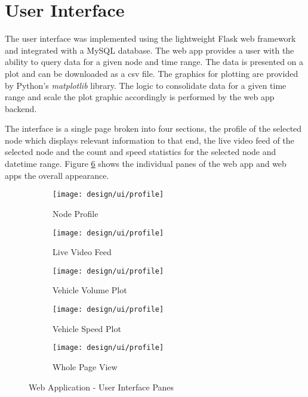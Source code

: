 \section{User Interface}

The user interface was implemented using the lightweight Flask web framework and integrated with a MySQL database. The web app provides a user with the ability to query data for a given node and time range. The data is presented on a plot and can be downloaded as a csv file. The graphics for plotting are provided by Python's \emph{matplotlib} library. The logic to consolidate data for a given time range and scale the plot graphic accordingly is performed by the web app backend.

The interface is a single page broken into four sections, the profile of the selected node which displays relevant information to that end, the live video feed of the selected node and the count and speed statistics for the selected node and datetime range. Figure \ref{fig:dragonfly} shows the individual panes of the web app and web apps the overall appearance.

\begin{figure}[H]
	\centering
    \begin{subfigure}[b]{0.5\linewidth}
        \centering\texttt{[image: design/ui/profile]}
        \caption{Node Profile}
        \label{fig:}
    \end{subfigure}%
    \begin{subfigure}[b]{0.5\linewidth}
        \centering\texttt{[image: design/ui/profile]}
        \caption{Live Video Feed}
        \label{fig:}
    \end{subfigure}
    \begin{subfigure}[b]{0.5\linewidth}
        \centering\texttt{[image: design/ui/profile]}
        \caption{Vehicle Volume Plot}
        \label{fig:}
    \end{subfigure}
    \begin{subfigure}[b]{0.5\linewidth}
        \centering\texttt{[image: design/ui/profile]}
        \caption{Vehicle Speed Plot}
        \label{fig:}
    \end{subfigure}
    \begin{subfigure}[b]{0.5\linewidth}
        \centering\texttt{[image: design/ui/profile]}
        \caption{Whole Page View}
            \label{fig:}
    \end{subfigure}
    	\caption{Web Application - User Interface Panes}
    	\label{fig:dragonfly}
\end{figure}


